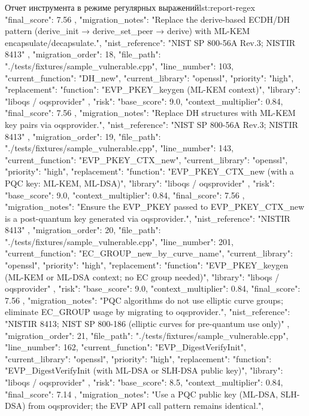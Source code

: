 \documentclass{itmo-vkr}
\begin{document}
\begin{itmolisting}[JSON]{Отчет инструмента в режиме регулярных выражений}{lst:report-regex}
{{{				"final_score": 7.56
			},
			"migration_notes": "Replace the derive-based ECDH/DH pattern (derive_init → derive_set_peer → derive) with ML-KEM encapsulate/decapsulate.",
			"nist_reference": "NIST SP 800-56A Rev.3; NISTIR 8413"
		},
		{
			"migration_order": 18,
			"file_path": "./tests/fixtures/sample_vulnerable.cpp",
			"line_number": 103,
			"current_function": "DH_new",
			"current_library": "openssl",
			"priority": "high",
			"replacement": {
				"function": "EVP_PKEY_keygen (ML-KEM context)",
				"library": "liboqs / oqsprovider"
			},
			"risk": {
				"base_score": 9.0,
				"context_multiplier": 0.84,
				"final_score": 7.56
			},
			"migration_notes": "Replace DH structures with ML-KEM key pairs via oqsprovider.",
			"nist_reference": "NIST SP 800-56A Rev.3; NISTIR 8413"
		},
		{
			"migration_order": 19,
			"file_path": "./tests/fixtures/sample_vulnerable.cpp",
			"line_number": 143,
			"current_function": "EVP_PKEY_CTX_new",
			"current_library": "openssl",
			"priority": "high",
			"replacement": {
				"function": "EVP_PKEY_CTX_new (with a PQC key: ML-KEM, ML-DSA)",
				"library": "liboqs / oqsprovider"
			},
			"risk": {
				"base_score": 9.0,
				"context_multiplier": 0.84,
				"final_score": 7.56
			},
			"migration_notes": "Ensure the EVP_PKEY passed to EVP_PKEY_CTX_new is a post-quantum key generated via oqsprovider.",
			"nist_reference": "NISTIR 8413"
		},
		{
			"migration_order": 20,
			"file_path": "./tests/fixtures/sample_vulnerable.cpp",
			"line_number": 201,
			"current_function": "EC_GROUP_new_by_curve_name",
			"current_library": "openssl",
			"priority": "high",
			"replacement": {
				"function": "EVP_PKEY_keygen (ML-KEM or ML-DSA context; no EC group needed)",
				"library": "liboqs / oqsprovider"
			},
			"risk": {
				"base_score": 9.0,
				"context_multiplier": 0.84,
				"final_score": 7.56
			},
			"migration_notes": "PQC algorithms do not use elliptic curve groups; eliminate EC_GROUP usage by migrating to oqsprovider.",
			"nist_reference": "NISTIR 8413; NIST SP 800-186 (elliptic curves for pre-quantum use only)"
		},
		{
			"migration_order": 21,
			"file_path": "./tests/fixtures/sample_vulnerable.cpp",
			"line_number": 162,
			"current_function": "EVP_DigestVerifyInit",
			"current_library": "openssl",
			"priority": "high",
			"replacement": {
				"function": "EVP_DigestVerifyInit (with ML-DSA or SLH-DSA public key)",
				"library": "liboqs / oqsprovider"
			},
			"risk": {
				"base_score": 8.5,
				"context_multiplier": 0.84,
				"final_score": 7.14
			},
			"migration_notes": "Use a PQC public key (ML-DSA, SLH-DSA) from oqsprovider; the EVP API call pattern remains identical.",
}}
\end{itmolisting}
\end{document}
